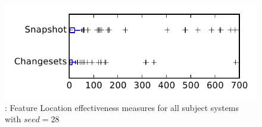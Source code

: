 
\begin{figure}
\centering
\includegraphics[height=0.4\textheight]{figures/flt_seed/rq1_tiny_28}
\caption{\rone: Feature Location effectiveness measures for all subject systems with $seed=28$}
\label{fig:flt_seed:rq1:tiny}
\end{figure}
